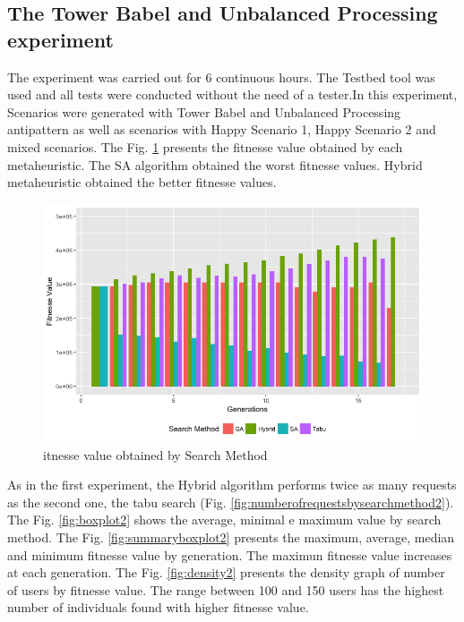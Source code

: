 \documentclass[times]{stvrauth}
\begin{document}
\subsection{The Tower Babel  and Unbalanced Processing experiment}

The experiment was carried out for 6 continuous hours. The Testbed tool was used and all tests were conducted without the need of a tester.In this experiment, Scenarios were generated with Tower Babel and Unbalanced Processing antipattern as well as scenarios with Happy Scenario 1, Happy Scenario 2 and mixed scenarios. The Fig. \ref{fig:fitnessebygeneration2}  presents the fitnesse value obtained by each metaheuristic. The SA algorithm obtained the worst fitnesse values. Hybrid metaheuristic obtained the better fitnesse values.


\begin{figure}[h]
\centering
\includegraphics[width=.7\textwidth]{./images/experiment2-7.png}
\caption{itnesse value obtained by Search Method}
\label{fig:fitnessebygeneration2}
\end{figure}

As in the first experiment, the Hybrid algorithm performs twice as many requests as the second one, the tabu search (Fig. \ref{fig:numberofrequestsbysearchmethod2}). The Fig. \ref{fig:boxplot2} shows the average, minimal e maximum value by search method. The Fig. \ref{fig:summaryboxplot2} presents the maximum, average, median and minimum fitnesse value by generation. The maximun fitnesse value increases at each generation. The Fig. \ref{fig:density2} presents the density graph of number of users by fitnesse value. The range between 100 and 150 users has the highest number of individuals found with higher fitnesse value.
\end{document}
